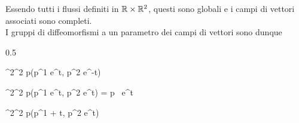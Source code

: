 {Essendo tutti i flussi definiti in $ \mathbb{R} \times \mathbb{R}^{2} $, questi sono globali e i campi di vettori associati sono completi. \\
I gruppi di diffeomorfismi a un parametro dei campi di vettori sono dunque

	{0.5}{%
				{\R^{2}}{\R^{2}}
				{p}{(p^{1} e^{t}, p^{2} e^{-t})}
			
			\map{F_{Y,t}}
				{\R^{2}}{\R^{2}}
				{p}{(p^{1} e^{t}, p^{2} e^{t}) = p \, e^{t}}
			
			\map{F_{Z,t}}
				{\R^{2}}{\R^{2}}
				{p}{(p^{1} + t, p^{2} e^{t})}
			}
}


